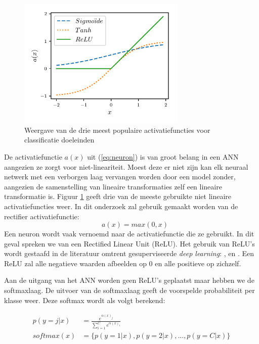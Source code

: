 \begin{figure}[ht]
	\begin{center}
		\includegraphics[width=8cm,keepaspectratio]{figuren/activatiefuncties.pdf}
		\caption{Weergave van de drie meest populaire activatiefuncties voor classificatie doeleinden \label{fig:activatie-fun}}
	\end{center}
\end{figure}
\npar De activatiefunctie $a(x)$ uit (\ref{eq:neuron}) is van groot belang in een ANN aangezien ze zorgt voor niet-lineariteit. Moest deze er niet zijn kan elk neuraal netwerk met een verborgen laag vervangen worden door een model zonder, aangezien de samenstelling van lineaire transformaties zelf een lineaire transformatie is. Figuur \ref{fig:activatie-fun} geeft drie van de meeste gebruikte niet lineaire activatiefuncties weer. In dit onderzoek zal gebruik gemaakt worden van de rectifier activatiefunctie:
\begin{equation}
\quad a(x) = max(0,x)
\end{equation}
Een neuron wordt vaak vernoemd naar de activatiefunctie die ze gebruikt. In dit geval spreken we van een Rectified Linear Unit (ReLU). Het gebruik van ReLU's wordt gestaafd in de literatuur omtrent gesuperviseerde \textit{deep learning}: \cite{ReLU}, \cite{lionel} en \cite{wu_deep_2016}. Een ReLU zal alle negatieve waarden afbeelden op 0 en alle positieve op zichzelf.

\npar Aan de uitgang van het ANN worden geen ReLU's geplaatst maar hebben we de softmaxlaag. De uitvoer van de softmaxlaag geeft de voorspelde probabiliteit per klasse weer. Deze softmax wordt als volgt berekend:

\begin{equation}
\begin{aligned}
p(y = j | x) &= \frac{e^{\alpha(x)_j}}{\sum_{i=1}^{C}e^{\alpha(x)_i}}\\
softmax(x) &= \{p(y = 1 | x), p(y = 2 | x), ... , p(y = C | x)\}
\end{aligned}
\end{equation}

